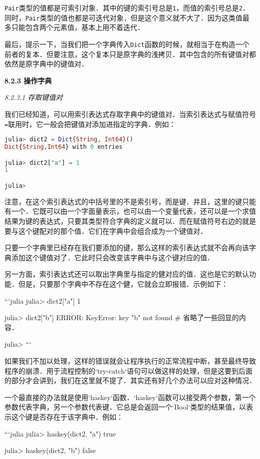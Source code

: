 \verb|Pair|类型的值都是可索引对象．其中的键的索引号总是\verb|1|，而值的索引号总是\verb|2|．同时，\verb|Pair|类型的值也都是可迭代对象．但是这个意义就不大了．因为这类值最多只能包含两个元素值，基本上用不着迭代．

最后，提示一下，当我们把一个字典传入\verb|Dict|函数的时候，就相当于在构造一个前者的复本．但要注意，这个复本只是原字典的浅拷贝．其中包含的所有键值对都依然是原字典中的键值对．

\textbf{8.2.3 操作字典}

\textsl{8.2.3.1 存取键值对}

我们已经知道，可以用索引表达式存取字典中的键值对．当索引表达式与赋值符号\verb|=|联用时，它一般会把键值对添加进指定的字典．例如：
\begin{lstlisting}[language=julia]
julia> dict2 = Dict{String, Int64}()
Dict{String,Int64} with 0 entries

julia> dict2["a"] = 1
1

julia> 
\end{lstlisting}

注意，在这个索引表达式的中括号里的不是索引号，而是键．并且，这里的键只能有一个．它既可以由一个字面量表示，也可以由一个变量代表，还可以是一个求值结果为键的表达式，只要其类型符合字典的定义就可以．而在赋值符号右边的就是要与这个键配对的那个值．它们在字典中会组合成为一个键值对．

只要一个字典里已经存在我们要添加的键，那么这样的索引表达式就不会再向该字典添加这个键值对了．它此时只会改变该字典中与这个键对应的值．

另一方面，索引表达式还可以取出字典里与指定的健对应的值．这也是它的默认功能．但是，只要那个字典中不存在这个健，它就会立即报错．示例如下：

```julia
julia> dict2["a"]
1

julia> dict2["b"]
ERROR: KeyError: key "b" not found
# 省略了一些回显的内容．

julia> 
```

如果我们不加以处理，这样的错误就会让程序执行的正常流程中断，甚至最终导致程序的崩溃．用于流程控制的`try-catch`语句可以做这样的处理，但是这要到后面的部分才会讲到，我们在这里就不提了．其实还有好几个办法可以应对这种情况．

一个最直接的办法就是使用`haskey`函数．`haskey`函数可以接受两个参数，第一个参数代表字典，另一个参数代表键．它总是会返回一个`Bool`类型的结果值，以表示这个键是否存在于该字典中．例如：

```julia
julia> haskey(dict2, "a")
true

julia> haskey(dict2, "b")
false

